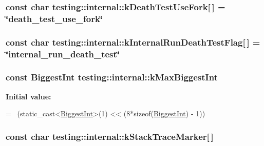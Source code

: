 \hypertarget{namespacetesting_1_1internal_a32051e2574562b548be3e26a52eaa553}{
\subsubsection[{k\+Death\+Test\+Use\+Fork}]{\setlength{\rightskip}{0pt plus 5cm}const char testing\+::internal\+::k\+Death\+Test\+Use\+Fork\mbox{[}$\,$\mbox{]} = \char`\"{}death\+\_\+test\+\_\+use\+\_\+fork\char`\"{}}}\label{namespacetesting_1_1internal_a32051e2574562b548be3e26a52eaa553}
\hypertarget{namespacetesting_1_1internal_a8572303d929880adf30db00952e1c45d}{
\subsubsection[{k\+Internal\+Run\+Death\+Test\+Flag}]{\setlength{\rightskip}{0pt plus 5cm}const char testing\+::internal\+::k\+Internal\+Run\+Death\+Test\+Flag\mbox{[}$\,$\mbox{]} = \char`\"{}internal\+\_\+run\+\_\+death\+\_\+test\char`\"{}}}\label{namespacetesting_1_1internal_a8572303d929880adf30db00952e1c45d}
\hypertarget{namespacetesting_1_1internal_ad901880198832bc166d2493096b451f7}{
\subsubsection[{k\+Max\+Biggest\+Int}]{\setlength{\rightskip}{0pt plus 5cm}const {\bf Biggest\+Int} testing\+::internal\+::k\+Max\+Biggest\+Int}}\label{namespacetesting_1_1internal_ad901880198832bc166d2493096b451f7}
{\bfseries Initial value\+:}
\begin{DoxyCode}
=
    ~(\textcolor{keyword}{static\_cast<}\hyperlink{namespacetesting_1_1internal_a05c6bd9ede5ccdf25191a590d610dcc6}{BiggestInt}\textcolor{keyword}{>}(1) << (8*\textcolor{keyword}{sizeof}(\hyperlink{namespacetesting_1_1internal_a05c6bd9ede5ccdf25191a590d610dcc6}{BiggestInt}) - 1))
\end{DoxyCode}
\hypertarget{namespacetesting_1_1internal_a999c7ef9ff01b6d2d76669372c444aa3}{
\subsubsection[{k\+Stack\+Trace\+Marker}]{ const char testing\+::internal\+::k\+Stack\+Trace\+Marker\mbox{[}$\,$\mbox{]}}}\label{namespacetesting_1_1internal_a999c7ef9ff01b6d2d76669372c444aa3}
